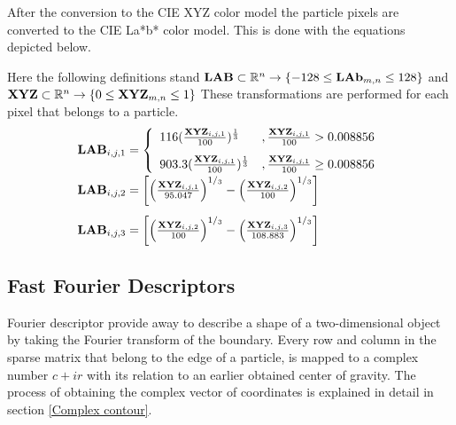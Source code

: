 \documentclass[11pt,fleqn,,a4paper,twoside,openright]{book}
\begin{document}
After the conversion to the CIE XYZ color model the particle pixels are converted to the CIE La*b* color model. This is done with the equations depicted below.
\begin{sBox}
	Here the following definitions stand $\mat{LAB} \subset \mathbb{R}^n \rightarrow \{-128 \leq \mat{LAb}_{m,n} \leq 128\} $ and $\mat{XYZ} \subset \mathbb{R}^n \rightarrow \{0 \leq \mat{XYZ}_{m,n} \leq 1\} $ These transformations are performed for each pixel that belongs to a particle.
	\begin{equation}
	\begin{array}{ll}
		\mat{LAB}_{i,j,1} = \left\{
		\begin{array}{ll}
		116(\frac{\mat{XYZ}_{i,j,1}}{100})^{\frac{1}{3}} & ,\frac{\mat{XYZ}_{i,j,1}}{100} > 0.008856 \\[0.3cm]
		903.3(\frac{\mat{XYZ}_{i,j,1}}{100})^{\frac{1}{3}} & ,\frac{\mat{XYZ}_{i,j,1}}{100} \geq 0.008856 
		\end{array} 
		\right. \\[0.5cm]
	    \mat{LAB}_{i,j,2} = \left[\left(\frac{\mat{XYZ}_{i,j,1}}{95.047}\right)^{1/_3} - \left(\frac{\mat{XYZ}_{i,j,2}}{100}\right)^{1/_3}\right] \\[0.5cm]
 	    \mat{LAB}_{i,j,3} = \left[\left(\frac{\mat{XYZ}_{i,j,2}}{100}\right)^{1/_3} - \left(\frac{\mat{XYZ}_{i,j,3}}{108.883}\right)^{1/_3}\right]  	    
	\end{array}
	\end{equation}
\end{sBox}

\subsection{Fast Fourier Descriptors}\label{FFT}
Fourier descriptor provide away to describe a shape of a two-dimensional object by taking the Fourier transform of the boundary. Every row and column in the sparse matrix that belong to the edge of a particle, is mapped to a complex number $ c + i r $ with its relation to an earlier obtained center of gravity. The process of obtaining the complex vector of coordinates is explained in detail in section \ref{Complex contour}.
\end{document}
